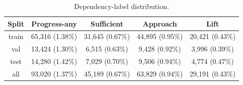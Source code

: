 \begin{table}[htbp]
  \centering
  \caption{Dependency-label distribution.}
  \label{tab:stage1_label_distribution}
  \small
  \setlength{\tabcolsep}{4.5pt}
  \begin{tabular}{ccccc}
    \toprule
    Split & Progress-any & Sufficient & Approach & Lift \\
    \midrule
    train & 65,316 (1.38\%) & 31,645 (0.67\%) & 44,895 (0.95\%) & 20,421 (0.43\%) \\
    val & 13,424 (1.30\%) & 6,515 (0.63\%) & 9,428 (0.92\%) & 3,996 (0.39\%) \\
    test & 14,280 (1.42\%) & 7,029 (0.70\%) & 9,506 (0.94\%) & 4,774 (0.47\%) \\
    all & 93,020 (1.37\%) & 45,189 (0.67\%) & 63,829 (0.94\%) & 29,191 (0.43\%) \\
    \bottomrule
  \end{tabular}
\end{table}

